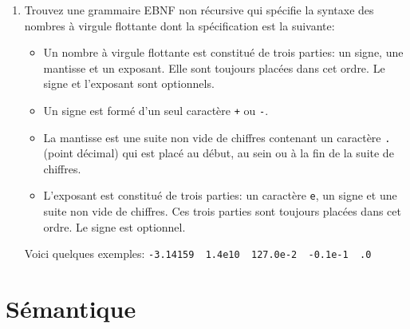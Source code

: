 \documentclass[11pt,a4paper]{article}
\begin{document}
\begin{enumerate}
  \item Trouvez une grammaire EBNF non récursive qui spécifie la
  syntaxe des nombres à virgule flottante dont la spécification est la
  suivante:

  \begin{itemize}

    \item Un nombre à virgule flottante est constitué de trois
    parties: un signe, une mantisse et un exposant. Elle sont toujours
    placées dans cet ordre. Le signe et l'exposant sont optionnels.

    \item Un signe est formé d'un seul caractère \texttt{+} ou
    \texttt{-}.

    \item La mantisse est une suite non vide de chiffres contenant un
    caractère \texttt{.} (point décimal) qui est placé au début, au
    sein ou à la fin de la suite de chiffres.

    \item L'exposant est constitué de trois parties: un caractère
    \texttt{e}, un signe et une suite non vide de chiffres. Ces trois
    parties sont toujours placées dans cet ordre. Le signe est
    optionnel.

  \end{itemize}

  \noindent Voici quelques exemples:
  \verb|-3.14159  1.4e10  127.0e-2  -0.1e-1  .0|

\end{enumerate}


\section{Sémantique}
\end{document}
